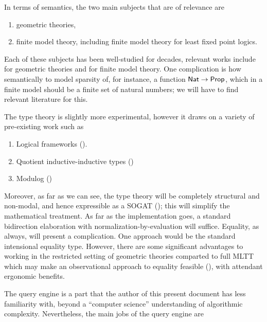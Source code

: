 \documentclass{article}
\begin{document}
In terms of semantics, the two main subjects that are of relevance are
\begin{enumerate}
  \item geometric theories,
  \item finite model theory, including finite model theory for least fixed point logics.
\end{enumerate}
Each of these subjects has been well-studied for decades, relevant works include \cite{johnstone-2002-sketches} for geometric theories and \cite{libkin-2004-elements} for finite model theory. One complication is how semantically to model sparsity of, for instance, a function $\mathsf{Nat} \to \mathsf{Prop}$, which in a finite model should be a finite set of natural numbers; we will have to find relevant literature for this.

The type theory is slightly more experimental, however it draws on a variety of pre-existing work such as
\begin{enumerate}
  \item Logical frameworks (\cite{pfenning-1999-system}).
  \item Quotient inductive-inductive types (\cite{kovacs-2022-typetheoretic})
  \item Modulog (\cite{atkey-2018-modulog})
\end{enumerate}
Moreover, as far as we can see, the type theory will be completely structural and non-modal, and hence expressible as a SOGAT (\cite{kaposi-2024-secondorder}); this will simplify the mathematical treatment. As far as the implementation goes, a standard bidirection elaboration with normalization-by-evaluation will suffice. Equality, as always, will present a complication. One approach would be the standard intensional equality type. However, there are some significant advantages to working in the restricted setting of geometric theories comparted to full MLTT which may make an observational approach to equality feasible (\cite{altenkirch-2006-observational}), with attendant ergonomic benefits.

The query engine is a part that the author of this present document has less familiarity with, beyond a ``computer science'' understanding of algorithmic complexity. Nevertheless, the main jobs of the query engine are
\end{document}

